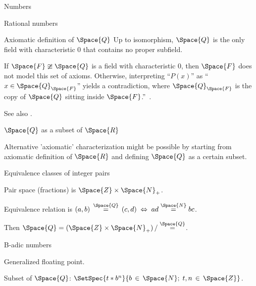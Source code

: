 \begin{plSection}{Numbers}
\begin{plSection}{Rational numbers}
\begin{plSection}{Axiomatic definition of \texorpdfstring{$\Space{Q}$}{Q}}
Up to isomorphism, 
$ \Space{Q} $ is the only field with characteristic $ 0 $ 
that contains no proper subfield.

If $ \Space{F} \ncong \Space{Q} $ is 
a field with characteristic $ 0 $, 
then $ \Space{F} $ does not model this set of axioms. 
Otherwise, interpreting “$ P(x) $” as 
“$ x \in \Space{Q}_{\Space{F}} $” yields a contradiction, 
where $ \Space{Q}_{\Space{F}} $ is the copy of $ \Space{Q} $ 
sitting inside 
$ \Space{F} $.''~\cite{HaskellCurry:2012:RationalAxioms}.

See also \cite{Lawrence:2017:Rationals}.

\end{plSection}%
\begin{plSection}{\texorpdfstring{$\Space{Q}$}{Q}
as a subset of 
\texorpdfstring{$\Space{R}$}{R}}
\label{sec:Q_subset_of_R}

Alternative 'axiomatic' characterization
might be possible by starting from axiomatic definition of
$\Space{R}$ and defining $\Space{Q}$ as a certain subset.
\end{plSection}%
\begin{plSection}{Equivalence classes of integer pairs}
\label{sec:Equivalence_classes_of_integer_pairs}

Pair space (fractions) is $\Space{Z} \times \Space{N}_{+}$.

Equivalence relation is 
$(a,b) \, \overset{\Space{Q}}{=} \, (c,d) 
\; \Leftrightarrow \; 
ad \overset{\Space{N}}{=} bc$.

Then 
$\Space{Q} = 
(\Space{Z} \times \Space{N}_{+}) 
\, / 
\overset{\Space{Q}}{=}$.

\end{plSection}%
\end{plSection}%
\begin{plSection}{B-adic numbers}
\label{Sec:b_adic_numbers}

Generalized floating point.

Subset of $\Space{Q}$:
$\SetSpec{t \ast b^n}{ b\,\in\,\Space{N};\; t,n\,\in\,\Space{Z}}$.


\end{plSection}
\end{plSection}
